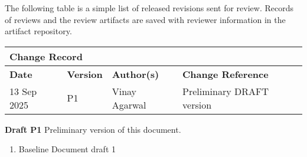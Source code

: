The following table is a simple list of released revisions sent for review.
Records of reviews and the review artifacts are saved with reviewer information in the \KNEADagencyName artifact repository.

\begin{table}[h]
	\centering 
		\begin{tabular}{|p{1.0in}|p{0.8in}|p{1.4in}|p{2.1in}|}
    \multicolumn{4}{l}{\bfseries Change Record} \\
		\hline
			{\bfseries Date}  &  {\bfseries Version} & {\bfseries Author(s)} & {\bfseries Change Reference} \\
		\hline
		\hline
			 13 Sep 2025	&	\centering	P1	&	{\raggedright Vinay Agarwal}	&	Preliminary DRAFT version  \\ \hline
		\hline		
		\hline				
  	\end{tabular}
\end{table}




{\bf Draft P1}
Preliminary version of this document.

\begin{enumerate}[itemindent=5pt,topsep=0pt,itemsep=0pt,partopsep=0pt, parsep=0pt]
	\item Baseline Document draft 1           
\end{enumerate}

